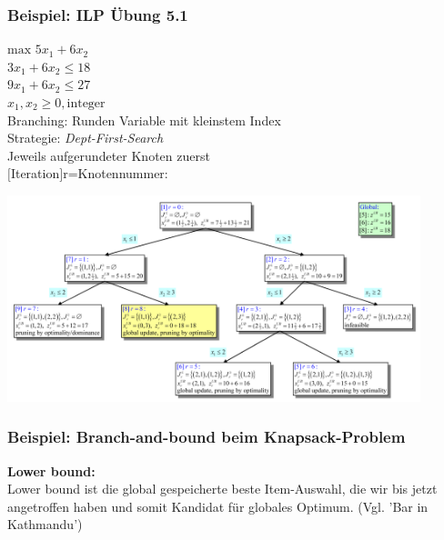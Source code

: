 \subsubsection{Beispiel: ILP Übung 5.1}
\begin{minipage}{6cm}
	$\text{max } 5x_1+6x_2$\\
	$3x_1 + 6x_2 \leqslant 18$\\
	$9x_1+6x_2 \leqslant 27$\\
	$x_1,x_2 \geqslant 0, \text{integer}$\\
	
	Branching: Runden Variable mit kleinstem Index\\
	Strategie: \textit{Dept-First-Search}\\
	Jeweils aufgerundeter Knoten zuerst\\
	$[$Iteration$]$r=Knotennummer:\\
\end{minipage}
\begin{minipage}{12cm}
	\includegraphics[width=12cm]{Content/IntProg/branch-bound-lp}
\end{minipage}

\subsubsection{Beispiel: Branch-and-bound beim Knapsack-Problem }

\textbf{Lower bound:}\\
Lower bound ist die global gespeicherte beste Item-Auswahl, die wir bis jetzt angetroffen haben und somit Kandidat für globales Optimum. (Vgl. 'Bar in Kathmandu')\\

